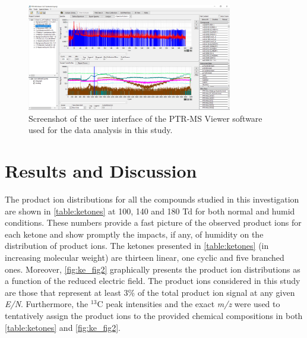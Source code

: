 \begin{figure}[t]
\centering
\includegraphics[width=0.8\textwidth]{pics/ptrmsviewer.png}
\caption{Screenshot of the user interface of the PTR-MS Viewer software used for the data analysis in this study.}
\label{fig:ke_viewer}
\end{figure}








\section{Results and Discussion}
The product ion distributions for all the compounds studied in this investigation are shown in \autoref{table:ketones} at 100, 140 and 180 Td for both normal and humid conditions.
These numbers provide a fast picture of the observed product ions for each ketone and show promptly the impacts, if any, of humidity on the distribution of product ions.
The ketones presented in \autoref{table:ketones} (in increasing molecular weight) are thirteen linear, one cyclic and five branched ones.
Moreover, \autoref{fig:ke_fig2} graphically presents the product ion distributions as a function of the reduced electric field. 
The product ions considered in this study are those that represent at least 3\% of the total product ion signal at any given \textit{E/N}.
Furthermore, the $^{13}$C peak intensities and the exact \textit{m/z} were used to tentatively assign the product ions to the provided chemical compositions in both \autoref{table:ketones} and \autoref{fig:ke_fig2}.



